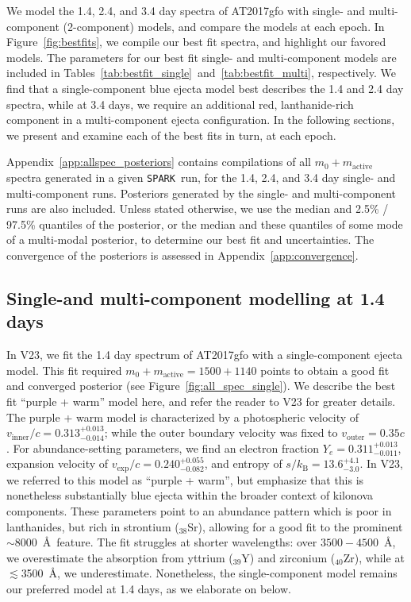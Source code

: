 \documentclass[twocolumn,twocolappendix]{aastex63}
\def\SPARK{\texttt{SPARK}}
\begin{document}
We model the 1.4, 2.4, and 3.4 day spectra of AT2017gfo with single- and multi-component (2-component) models, and compare the models at each epoch. In Figure~\ref{fig:bestfits}, we compile our best fit spectra, and highlight our favored models. The parameters for our best fit single- and multi-component models are included in Tables~\ref{tab:bestfit_single}~and~\ref{tab:bestfit_multi}, respectively. We find that a single-component blue ejecta model best describes the 1.4 and 2.4 day spectra, while at 3.4 days, we require an additional red, lanthanide-rich component in a multi-component ejecta configuration. In the following sections, we present and examine each of the best fits in turn, at each epoch. 

Appendix~\ref{app:allspec_posteriors} contains compilations of all $m_0 + m_{\mathrm{active}}$ spectra generated in a given \SPARK~run, for the 1.4, 2.4, and 3.4 day single- and multi-component runs. Posteriors generated by the single- and multi-component runs are also included. Unless stated otherwise, we use the median and 2.5\% / 97.5\% quantiles of the posterior, or the median and these quantiles of some mode of a multi-modal posterior, to determine our best fit and uncertainties. The convergence of the posteriors is assessed in Appendix~\ref{app:convergence}.



\subsection{Single-and multi-component modelling at 1.4 days}\label{ssc:1.4}

In V23, we fit the 1.4 day spectrum of AT2017gfo with a single-component ejecta model. This fit required $m_0 + m_{\mathrm{active}} = 1500 + 1140$ points to obtain a good fit and converged posterior (see Figure~\ref{fig:all_spec_single}). We describe the best fit ``purple + warm'' model here, and refer the reader to V23 for greater details. The purple + warm model is characterized by a photospheric velocity of $v_{\mathrm{inner}}/c = 0.313^{+0.013}_{-0.014}$; while the outer boundary velocity was fixed to $v_{\mathrm{outer}} = 0.35c$. For abundance-setting parameters, we find an electron fraction $Y_e = 0.311^{+0.013}_{-0.011}$, expansion velocity of $v_{\mathrm{exp}}/c = 0.240^{+0.055}_{-0.082}$, and entropy of $s / k_{\mathrm{B}} = 13.6^{+4.1}_{-3.0}$. In V23, we referred to this model as ``purple + warm'', but emphasize that this is nonetheless substantially blue ejecta within the broader context of kilonova components. These parameters point to an abundance pattern which is poor in lanthanides, but rich in strontium (${}_{38}$Sr), allowing for a good fit to the prominent $\sim$8000~\AA~feature. The fit struggles at shorter wavelengths: over $3500-4500$~\AA, we overestimate the absorption from yttrium (${}_{39}$Y) and zirconium (${}_{40}$Zr), while at $\lesssim$3500~\AA, we underestimate. Nonetheless, the single-component model remains our preferred model at 1.4 days, as we elaborate on below.
\end{document}
